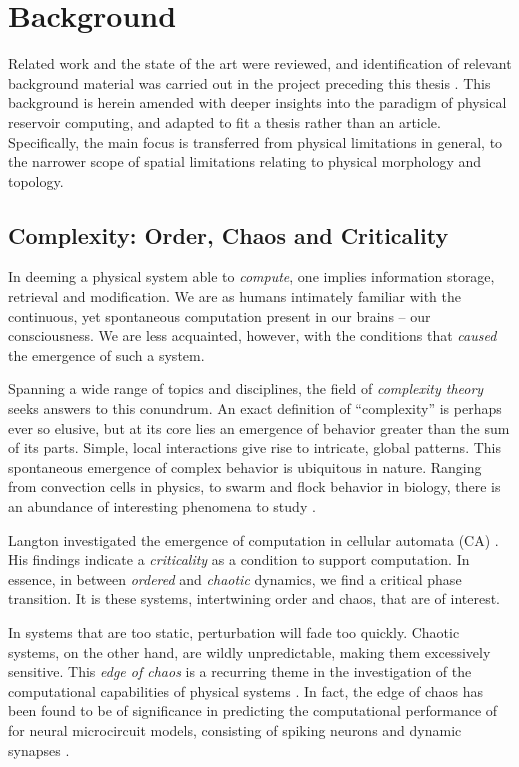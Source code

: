 \chapter{Background}
\label{ch:background}

Related work and the state of the art were reviewed, and identification of
relevant background material was carried out in the project preceding this
thesis \cite{aven_exploring_2019}. This background is herein amended with deeper
insights into the paradigm of physical reservoir computing, and adapted to fit a
thesis rather than an article. Specifically, the main focus is transferred from
physical limitations in general, to the narrower scope of spatial limitations
relating to physical morphology and topology.

\section{Complexity: Order, Chaos and Criticality}
\label{sec:criticality}

In deeming a physical system able to \textit{compute}, one implies information
storage, retrieval and modification. We are as humans intimately familiar with
the continuous, yet spontaneous computation present in our brains -- our
consciousness. We are less acquainted, however, with the conditions that
\textit{caused} the emergence of such a system.

Spanning a wide range of topics and disciplines, the field of \textit{complexity
theory} seeks answers to this conundrum. An exact definition of ``complexity''
is perhaps ever so elusive, but at its core lies an emergence of behavior
greater than the sum of its parts. Simple, local interactions give rise to
intricate, global patterns. This spontaneous emergence of complex behavior is
ubiquitous in nature. Ranging from convection cells in physics, to swarm and
flock behavior in biology, there is an abundance of interesting phenomena to
study \cite{heylighen_science_1999-1}.

Langton investigated the emergence of computation in cellular automata (CA)
\cite{langton_computation_1990}. His findings indicate a \textit{criticality} as
a condition to support computation. In essence, in between \textit{ordered} and
\textit{chaotic} dynamics, we find a critical phase transition. It is these
systems, intertwining order and chaos, that are of interest.

In systems that are too static, perturbation will fade too quickly. Chaotic
systems, on the other hand, are wildly unpredictable, making them excessively
sensitive. This \textit{edge of chaos} is a recurring theme in the investigation
of the computational capabilities of physical systems
\cite{langton_computation_1990}. In fact, the edge of chaos has been found to be
of significance in predicting the computational performance of for neural
microcircuit models, consisting of spiking neurons and dynamic synapses
\cite{legenstein_edge_2007}.

